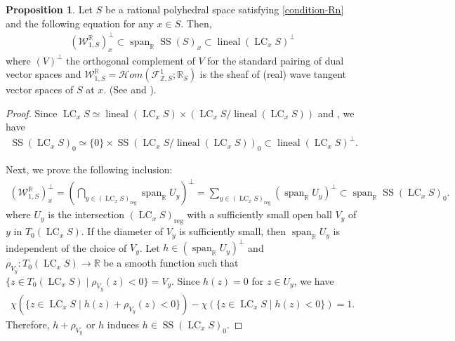 \documentclass[a4paper,dvipdfmx,reqno,12pt]{amsart}
\theoremstyle{definition}
\newtheorem{proposition}[theorem]{Proposition}
\newcommand{\opn}[1]{\operatorname{#1}}
\numberwithin{equation}{section}
\begin{document}
\begin{proposition}
\label{condition-good-linearity-space}
Let $S$ be a rational polyhedral space 
satisfying \cref{condition-Rn} and the following
equation for any $x\in S$. Then,
\begin{align} \label{equation-W-SS-Lin}
(\mathcal{W}_{1,S}^{\mathbb{R}})_{x}^{\bot}\subset 
\opn{span}_{{\mathbb{R}}}\opn{SS}(S)_x\subset
\opn{lineal}(\opn{LC}_xS)^{\bot}
\end{align}
where $(V)^{\bot}$ the orthogonal complement of 
$V$ for the standard pairing of dual vector spaces
and $\mathcal{W}_{1,S}^{\mathbb{R}}=
\mathcal{H}om(\mathcal{F}^{1}_{\mathbb{Z},S};\mathbb{R}_S)$ is 
the sheaf of (real) wave tangent 
vector spaces of $S$ at $x$. (See \cite[1.3]{mikhalkinTropicalEigenwaveIntermediate2014a} and 
\cite[Definition 2.16, Proposition 2.20, Remark 2.21]{yamamotoTropicalContractionsIntegral2021}).
\end{proposition}
\begin{proof}
Since
$\opn{LC}_x S\simeq 
\opn{lineal}(\opn{LC}_x S)\times 
(\opn{LC}_x S/\opn{lineal}(\opn{LC}_x S))$
and 
\cite[Proposition 5.4.1]{MR1299726}, we have
\begin{align} 
\opn{SS}(\opn{LC}_x S)_0\simeq \{0\}\times 
\opn{SS}(\opn{LC}_x S/\opn{lineal}(\opn{LC}_x S))_0
\subset \opn{lineal}(\opn{LC}_xS)^{\bot}.
\end{align}

Next, we prove the following inclusion:
\begin{align}
(\mathcal{W}_{1,S}^{\mathbb{R}})_{x}^{\bot}=(\bigcap_{y \in (\opn{LC}_xS)_{\opn{reg}}} 
\opn{span}_{\mathbb{R}} U_y)^{\bot}=
\sum_{y \in (\opn{LC}_xS)_{\opn{reg}}} 
(\opn{span}_{\mathbb{R}} U_y)^{\bot} \subset 
\opn{span}_{\mathbb{R}}\opn{SS}(\opn{LC}_x S)_0.
\end{align}
where $U_y$ is the intersection 
$(\opn{LC}_xS)_{\opn{reg}}$ with a sufficiently 
small open ball $V_y$ of $y$ in $T_0(\opn{LC}_xS)$.
If the diameter of $V_y$ is sufficiently small, 
then $\opn{span}_{\mathbb{R}} U_y$ is independent of 
the choice of $V_y$. 
Let $h\in (\opn{span}_{\mathbb{R}} U_y)^{\bot}$ and 
$\rho_{V_y}\colon T_0 (\opn{LC}_x S)\to \mathbb{R}$
be a smooth function such that 
$\{z \in T_0 (\opn{LC}_x S) \mid \rho_{V_y}(z)<0\}=V_y$.
Since $h(z)=0$ for $z\in U_y$, we have
\begin{align}
\chi(\{z\in \opn{LC}_x S\mid h(z)+\rho_{V_y}(z)<0\})
-\chi(\{z\in \opn{LC}_x S\mid h(z)<0\})=1.
\end{align}
Therefore, $h+\rho_{V_y}$ or $h$ induces 
$h\in \opn{SS}(\opn{LC}_x S)_0$.
\end{proof}
\end{document}
